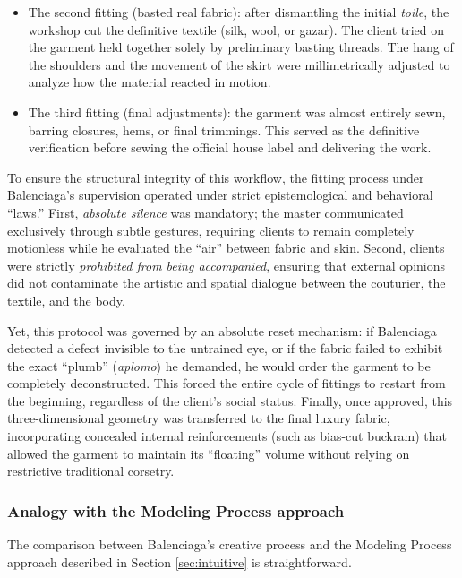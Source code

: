 \documentclass[11pt, a4paper]{article}
\begin{document}
\begin{enumerate}
\begin{itemize}
\item {The second fitting (basted real fabric):} after dismantling the initial \textit{toile}, the workshop cut the definitive textile (silk, wool, or gazar). The client tried on the garment held together solely by preliminary basting threads. The hang of the shoulders and the movement of the skirt were millimetrically adjusted to analyze how the material reacted in motion.

\item {The third fitting (final adjustments):} the garment was almost entirely sewn, barring closures, hems, or final trimmings. This served as the definitive verification before sewing the official house label and delivering the work.

\end{itemize}
\end{enumerate}

To ensure the structural integrity of this workflow, the fitting process under Balenciaga's supervision operated under strict epistemological and behavioral ``laws.'' First, \textit{absolute silence} was mandatory; the master communicated exclusively through subtle gestures, requiring clients to remain completely motionless while he evaluated the ``air'' between fabric and skin. Second, clients were strictly \textit{prohibited from being accompanied}, ensuring that external opinions did not contaminate the artistic and spatial dialogue between the couturier, the textile, and the body.

Yet, this protocol was governed by an absolute reset mechanism: if Balenciaga detected a defect invisible to the untrained eye, or if the fabric failed to exhibit the exact ``plumb'' (\textit{aplomo}) he demanded, he would order the garment to be completely deconstructed. This forced the entire cycle of fittings to restart from the beginning, regardless of the client's social status. Finally, once approved, this three-dimensional geometry was transferred to the final luxury fabric, incorporating concealed internal reinforcements (such as bias-cut buckram) that allowed the garment to maintain its ``floating'' volume without relying on restrictive traditional corsetry.


\subsubsection*{Analogy with the Modeling Process approach}

The comparison between Balenciaga's creative process and the Modeling Process approach described in Section \ref{sec:intuitive} is straightforward.
\end{document}
